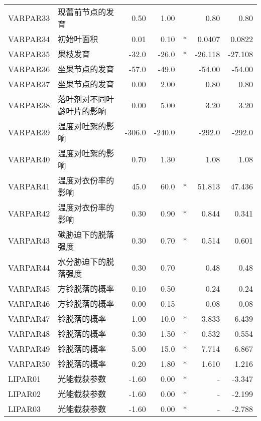 \begin{longtable}{llrrcrr}
    VARPAR33 & 现蕾前节点的发育           & 0.50   & 1.00   &     & 0.80    & 0.80    \\
    VARPAR34 & 初始叶面积                 & 0.01   & 0.10   & *   & 0.0407  & 0.0822  \\
    VARPAR35 & 果枝发育                   & -32.0  & -26.0  & *   & -26.118 & -27.108 \\
    VARPAR36 & 坐果节点的发育             & -57.0  & -49.0  &     & -54.00  & -54.00  \\
    VARPAR37 & 坐果节点的发育             & 0.00   & 2.00   &     & 0.80    & 0.80    \\
    VARPAR38 & 落叶剂对不同叶龄叶片的影响 & 0.00   & 5.00   &     & 3.20    & 3.20    \\
    VARPAR39 & 温度对吐絮的影响           & -306.0 & -240.0 &     & -292.0  & -292.0  \\
    VARPAR40 & 温度对吐絮的影响           & 0.70   & 1.30   &     & 1.08    & 1.08    \\
    VARPAR41 & 温度对衣份率的影响         & 45.0   & 60.0   & *   & 51.813  & 47.436  \\
    VARPAR42 & 温度对衣份率的影响         & 0.30   & 0.90   & *   & 0.844   & 0.341   \\
    VARPAR43 & 碳胁迫下的脱落强度         & 0.30   & 0.70   & *   & 0.514   & 0.601   \\
    VARPAR44 & 水分胁迫下的脱落强度       & 0.30   & 0.70   &     & 0.48    & 0.48    \\
    VARPAR45 & 方铃脱落的概率             & 0.10   & 0.50   &     & 0.24    & 0.24    \\
    VARPAR46 & 方铃脱落的概率             & 0.00   & 0.15   &     & 0.08    & 0.08    \\
    VARPAR47 & 铃脱落的概率               & 1.00   & 10.0   & *   & 3.833   & 6.439   \\
    VARPAR48 & 铃脱落的概率               & 0.30   & 1.50   & *   & 0.532   & 0.554   \\
    VARPAR49 & 铃脱落的概率               & 5.00   & 15.0   & *   & 7.714   & 6.867   \\
    VARPAR50 & 铃脱落的概率               & 0.20   & 1.80   & *   & 1.610   & 1.216   \\
    LIPAR01  & 光能截获参数               & -1.60  & 0.00   & *   & -       & -3.347  \\
    LIPAR02  & 光能截获参数               & -1.60  & 0.00   & *   & -       & -2.199  \\
    LIPAR03  & 光能截获参数               & -1.60  & 0.00   & *   & -       & -2.788  \\

\end{longtable}
